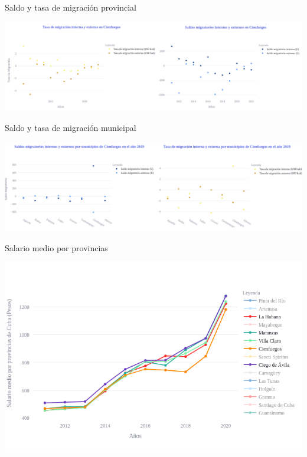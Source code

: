 \documentclass{beamer}
\begin{document}
\begin{frame}
    \begin{block}{Saldo y tasa de migración provincial}
        \begin{center}
            \includegraphics[width=1.0\textwidth]{img/fig4.png}
        \end{center}
    \end{block}
\end{frame}

\begin{frame}
    \begin{block}{Saldo y tasa de migración municipal}
        \begin{center}
            \includegraphics[width=1.0\textwidth]{img/fig5.png}
        \end{center}
        \end{block}
\end{frame}

\begin{frame}
    \begin{block}{Salario medio por provincias}
        \begin{center}
            \includegraphics[width=1.0\textwidth]{img/fig6.png}
        \end{center}
    \end{block}
\end{frame}
\end{document}
